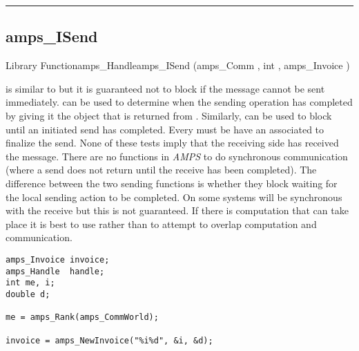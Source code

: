 
\noindent\rule{\textwidth}{1mm}

\subsection{amps\_ISend}
\label{amps_ISend}


\begin{deftypefn}{Library Function}{amps_Handle}{amps\_ISend}
(amps_Comm , int , amps_Invoice )

\DESCRIPTION

 is similar to  but it is guaranteed
not to block if the message cannot be sent immediately.
 can be used to determine when the sending operation has
completed by giving it the  object that is returned from
.  Similarly,  can be used to block
until an initiated send has completed.  Every  must be
have an associated  to finalize the send.  None of these
tests imply that the receiving side has received the message.  There are
no functions in {\em AMPS} to do synchronous communication (where a send
does not return until the receive has been completed).  The difference
between the two sending functions is whether they block waiting for the
local sending action to be completed.  On some systems 
will be synchronous with the receive but this is not guaranteed.  If there
is computation that can take place it is best to use 
rather than  to attempt to overlap computation and
communication.

\EXAMPLE

\begin{display}\begin{verbatim}
amps_Invoice invoice;
amps_Handle  handle;
int me, i;
double d;

me = amps_Rank(amps_CommWorld);

invoice = amps_NewInvoice("%i%d", &i, &d);


\end{verbatim}
\end{display}
\end{deftypefn}
